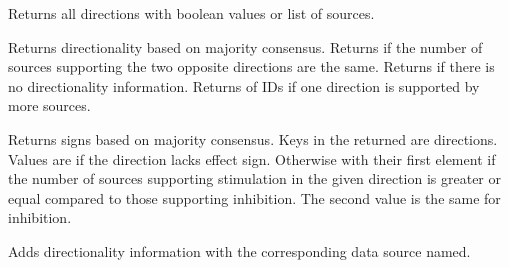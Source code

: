 \documentclass[letterpaper,10pt,english]{sphinxmanual}
\begin{document}
\begin{fulllineitems}
\begin{fulllineitems}
\end{fulllineitems}


\begin{fulllineitems}
\label{\detokenize{main:pypath.main.Direction.get_dirs}}
Returns all directions with boolean values
or list of sources.

\end{fulllineitems}


\begin{fulllineitems}
\label{\detokenize{main:pypath.main.Direction.majority_dir}}
Returns directionality based on majority consensus.
Returns  if the number of sources supporting the two opposite
directions are the same. Returns  if there is no directionality
information. Returns  of IDs if one direction is supported by
more sources.

\end{fulllineitems}


\begin{fulllineitems}
\label{\detokenize{main:pypath.main.Direction.majority_sign}}
Returns signs based on majority consensus. Keys in the returned  are directions.
Values are  if the direction lacks effect sign. Otherwise  with their
first element  if the number of sources supporting stimulation in the given
direction is greater or equal compared to those supporting inhibition. The second
value is the same for inhibition.

\end{fulllineitems}


\begin{fulllineitems}
\label{\detokenize{main:pypath.main.Direction.set_dir}}
Adds directionality information with
the corresponding data source named.


\end{fulllineitems}
\end{fulllineitems}
\end{document}
